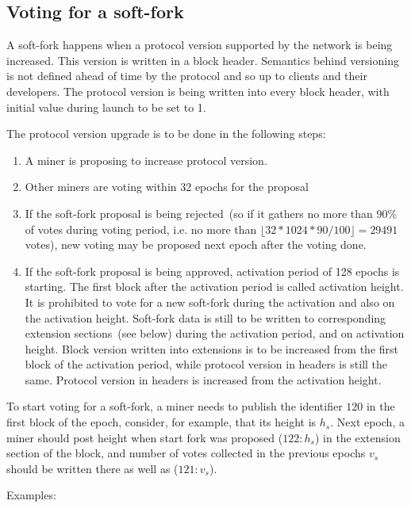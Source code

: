 \subsection{Voting for a soft-fork}

A soft-fork happens when a protocol version supported by the network is being increased. This version is written in a block
header. Semantics behind versioning is not defined ahead of time by the protocol and so up to clients and their
developers. The protocol version is being written into every block header, with initial value during launch to be set
to 1.

The protocol version upgrade is to be done in the following steps:
\begin{enumerate}
    \item{} A miner is proposing to increase protocol version.
    \item{} Other miners are voting within 32 epochs for the proposal
    \item{} If the soft-fork proposal is being rejected~(so if it gathers no more than $90\%$ of votes during voting period, i.e.
            no more than $\lfloor 32 * 1024 * 90 / 100 \rfloor = 29491$ votes), new voting may be proposed next epoch
            after the voting done.
    \item{} If the soft-fork proposal is being approved, activation period of 128 epochs is starting. The first block
    after the activation period is called activation height. It is prohibited to vote for a new soft-fork during the
    activation and also on the activation height. Soft-fork data is still to be
    written to corresponding extension sections~(see below) during the activation period, and on activation height.
    Block version written into extensions is to be increased from the first block of the activation period, while protocol
    version in headers is still the same. Protocol version in headers is increased from the activation height.
\end{enumerate}


To start voting for a soft-fork, a miner needs to publish the identifier $120$ in the first block of the epoch, consider,
for example, that its height is $h_s$. Next epoch, a miner should post height when start fork was proposed ($122: h_s$)
in the extension section of the block, and number of votes collected in the previous epochs $v_s$ should be written
there as well as ($121: v_s$).

Examples:

